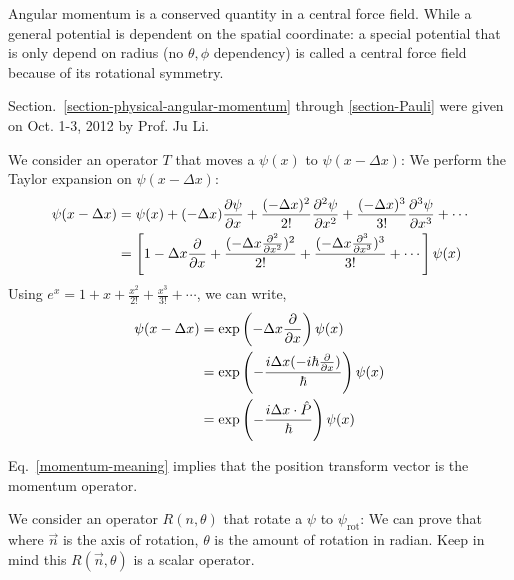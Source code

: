 \documentclass{school-22.101-notes}
\date{October 12, 2011}
\begin{document}
\maketitle

Angular momentum is a conserved quantity in a central force field. While a general potential is dependent on the spatial coordinate:
a special potential that is only depend on radius (no $\theta, \phi$ dependency) is called a central force field because of its rotational symmetry. 

Section.~\ref{section-physical-angular-momentum} through \ref{section-Pauli} were given on Oct. 1-3, 2012 by Prof. Ju Li. 

 We consider an operator $T$ that moves a $\psi(x)$ to $\psi(x-\Delta x)$: 
We perform the Taylor expansion on $\psi(x - \Delta x)$: 
\begin{align}
  \psi(x - \Delta x) &= \psi(x) + (-\Delta x) \frac{\partial \psi}{\partial x} + \frac{(-\Delta x)^2}{2!} \frac{\partial^{2} \psi}{\partial x ^{2}} + \frac{(-\Delta x)^3}{3!} \frac{\partial^{3} \psi}{\partial x ^{3}} + \cdots \\
  &= \left[ 1 - \Delta x \frac{\partial}{\partial x} + \frac{(-\Delta x \frac{\partial^{2} }{\partial x ^{2}})^2}{2!} + \frac{(-\Delta x \frac{\partial^{3} }{\partial x ^{3}})^3}{3!} + \cdots \right] \psi(x) 
\end{align}
Using $e^x = 1 + x + \frac{x^2}{2!} + \frac{x^3}{3!} + \cdots$, we can write, 
\begin{align}
  \psi(x - \Delta x) &= \exp \left( -\Delta x \frac{\partial}{\partial x} \right) \psi(x) \\
  &= \exp \left(- \frac{i \Delta x (-i \hbar \frac{\partial}{\partial x})}{\hbar} \right) \psi(x) \\
  &= \exp \left(-\frac{i \Delta x \cdot \hat{P} }{\hbar} \right) \psi(x) \label{momentum-meaning}
\end{align}

Eq.~\ref{momentum-meaning} implies that the position transform vector is the momentum operator. 


 We consider an operator $R(n, \theta)$ that rotate a $\psi$ to $\psi_{\mathrm{rot}}$: 
We can prove that 
where $\vec{n}$ is the axis of rotation, $\theta$ is the amount of rotation in radian.  Keep in mind this $R(\vec{n}, \theta)$ is a scalar operator. 
\end{document}
